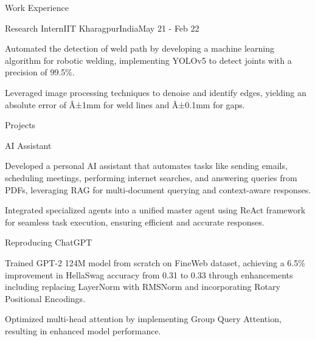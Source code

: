 \documentclass{resume}
\begin{document}
\begin{rSection}{Work Experience}
\begin{rSubsectionWork}{Research Intern}{IIT Kharagpur}{India}{May 21 - Feb 22}

\vspace{-3pt}
\item Automated the detection of weld path by developing a machine learning algorithm for robotic welding, implementing YOLOv5 to detect joints with a precision of 99.5\%.
\vspace{-3pt}
\item Leveraged image processing techniques to denoise and identify edges, yielding an absolute error of Â±1mm for weld lines and Â±0.1mm for gaps.
\end{rSubsectionWork}
\end{rSection}
\begin{rSection}{Projects}
\vspace{-3pt}

\begin{rSubsectionProj}{AI Assistant}

\vspace{-3pt}
\item Developed a personal AI assistant that automates tasks like sending emails, scheduling meetings, performing internet searches, and answering queries from PDFs, leveraging RAG for multi-document querying and context-aware responses.
\vspace{-3pt}
\item Integrated specialized agents into a unified master agent using ReAct framework for seamless task execution, ensuring efficient and accurate responses.
\end{rSubsectionProj}
\vspace{-3pt}

\begin{rSubsectionProj}{Reproducing ChatGPT}

\vspace{-3pt}
\item Trained GPT-2 124M model from scratch on FineWeb dataset, achieving a 6.5\% improvement in HellaSwag accuracy from 0.31 to 0.33 through enhancements including replacing LayerNorm with RMSNorm and incorporating Rotary Positional Encodings.
\vspace{-3pt}
\item Optimized multi-head attention by implementing Group Query Attention, resulting in enhanced model performance.
\end{rSubsectionProj}
\vspace{-3pt}


\end{rSection}
\end{document}
